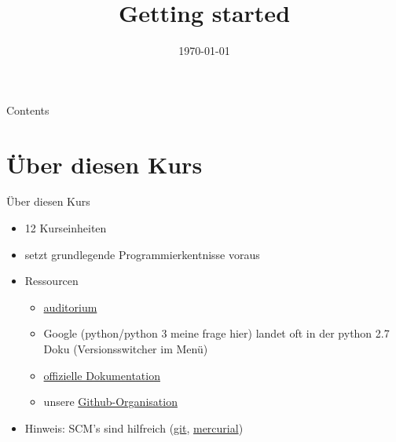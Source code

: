 


\newcommand{\topic}{
	Getting started
}

\title{\topic}
\supertitle{\course}
\date{\today}



\maketitle

\begin{frame}{Contents}
	\tableofcontents
\end{frame}


\section{Über diesen Kurs}
\begin{frame}{Über diesen Kurs}
	\begin{itemize}
    	\item 12 Kurseinheiten
    	\item setzt grundlegende Programmierkentnisse voraus
    	\item Ressourcen
    	\begin{itemize}
    	    \item \href{http://auditorium.inf.tu-dresden.de}{auditorium} %
	        \item Google (python/python 3 meine frage hier) landet oft in der python 2.7 Doku (Versionsswitcher im Menü)
    	    \item \href{docs.python.org}{offizielle Dokumentation}
    	    \item unsere \href{https://github.com/fsr}{Github-Organisation}
    	\end{itemize}
    	\item Hinweis: SCM's sind hilfreich (\href{https://git-scm.com}{git}, \href{http://mercurial.selenic.com/}{mercurial})
	\end{itemize}
\end{frame}

